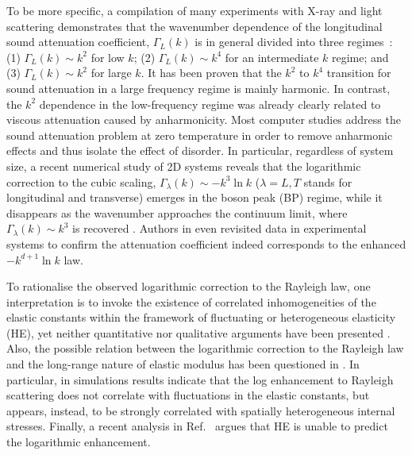 \documentclass[twoside,twocolumn,9pt]{article}
\begin{document}
To be more specific, a compilation of many experiments with X-ray and light scattering demonstrates that the wavenumber dependence of the longitudinal sound attenuation coefficient, $\Gamma_L(k)$ is in general divided into three regimes~\cite{Carini,Baldi,Ruffle,Masciovecchio,Giordano,Ruta,Monaco2011,Monaco2016,Monaco2009}: (1) $\Gamma_L(k)\sim k^2$ for low $k$; (2) $\Gamma_L(k)\sim k^4$ for an intermediate $k$ regime; and (3) $\Gamma_L(k)\sim k^2$ for large $k$. It has been proven that the $k^2$ to $k^4$ transition for sound attenuation in a large frequency regime is mainly harmonic. In contrast, the $k^2$ dependence in the low-frequency regime was already clearly related to viscous attenuation caused by anharmonicity. Most computer studies address the sound attenuation problem at zero temperature in order to remove anharmonic effects and thus isolate the effect of disorder. In particular, regardless of system size, a recent numerical study of 2D systems reveals that the logarithmic correction to the cubic scaling, $\Gamma_\lambda(k)\sim -k^3\ln k$ ($\lambda=L,T$ stands for longitudinal and transverse) emerges in the boson peak (BP) regime, while it disappears as the wavenumber approaches the continuum limit, where $\Gamma_\lambda(k)\sim k^3$ is recovered \cite{Mizuno2018}. Authors in \cite{Gelin2016} even revisited data in experimental systems to confirm the attenuation coefficient indeed corresponds to the enhanced $-k^{d+1}\ln k$ law.


To rationalise the observed logarithmic correction to the Rayleigh law, one interpretation is to invoke the existence of correlated inhomogeneities of the elastic constants within the framework of fluctuating or heterogeneous elasticity (HE), yet neither quantitative nor qualitative arguments have been presented \cite{Marruzzo2013,Mizuno2013,Mizuno2014,Marruzzo2013Vibrational,Mizuno2019Impact,Wang2019}. Also, the possible relation between the logarithmic correction to the Rayleigh law and the long-range nature of elastic modulus has been questioned in \cite{Mizuno2018,Moriel2019}. In particular, in \cite{Moriel2019} simulations results indicate that the log enhancement to Rayleigh scattering does not correlate with fluctuations in the elastic constants, but appears, instead, to be strongly correlated with spatially heterogeneous internal stresses. Finally, a recent analysis in Ref.~\cite{Lemaitre2019} argues that HE is unable to predict the logarithmic enhancement.
\end{document}
